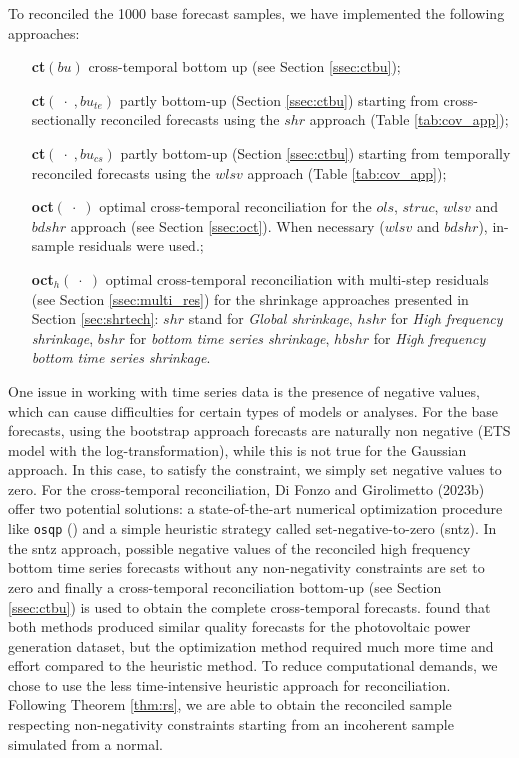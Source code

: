 \documentclass[a4paper,11pt]{article}
\theoremstyle{definition}
\begin{document}
To reconciled the 1000 base forecast samples, we have implemented the following approaches:
\begin{itemize}[nosep, leftmargin = 2.5cm]
	\item[\textbf{ct}$(bu)$] cross-temporal bottom up (see Section \ref{ssec:ctbu});
	\item[\textbf{ct}$(\;\cdot\;, bu_{te})$] partly bottom-up (Section \ref{ssec:ctbu}) starting from cross-sectionally reconciled forecasts using the $shr$ approach (Table \ref{tab:cov_app});
	\item[\textbf{ct}$(\;\cdot\;, bu_{cs})$] partly bottom-up (Section \ref{ssec:ctbu}) starting from temporally reconciled forecasts using the $wlsv$ approach (Table \ref{tab:cov_app});
	\item[\textbf{oct}$(\;\cdot\;)$] optimal cross-temporal reconciliation for the $ols$, $struc$, $wlsv$ and $bdshr$ approach (see Section \ref{ssec:oct}). When necessary ($wlsv$ and $bdshr$), in-sample residuals were used.;
	\item[\textbf{oct}$_{h}(\;\cdot\;)$] optimal cross-temporal reconciliation with multi-step residuals (see Section \ref{ssec:multi_res}) for the shrinkage approaches presented in Section \ref{sec:shrtech}: $shr$ stand for \textit{Global shrinkage}, $hshr$ for \textit{High frequency shrinkage}, $bshr$ for \textit{bottom time series shrinkage}, $hbshr$ for \textit{High frequency bottom time series shrinkage}.
\end{itemize}
One issue in working with time series data is the presence of negative values, which can cause difficulties for certain types of models or analyses. 
For the base forecasts, using the bootstrap approach forecasts are naturally non negative (ETS model with the log-transformation), while this is not true for the Gaussian approach. In this case, to satisfy the constraint, we simply set negative values to zero. For the cross-temporal reconciliation, Di Fonzo and Girolimetto (2023b) offer two potential solutions: a state-of-the-art numerical optimization procedure like \texttt{osqp} (\citealp{stellato2019, stellato2020}) and a simple heuristic strategy called set-negative-to-zero (sntz). In the sntz approach, possible negative values of the reconciled high frequency bottom time series forecasts without any non-negativity constraints are set to zero and finally a cross-temporal reconciliation bottom-up (see Section \ref{ssec:ctbu}) is used to obtain the complete cross-temporal forecasts. \cite{difonzo2023a} found that both methods produced similar quality forecasts for the photovoltaic power generation dataset, but the optimization method required much more time and effort compared to the heuristic method. To reduce computational demands, we chose to use the less time-intensive heuristic approach for reconciliation. Following Theorem \ref{thm:rs}, we are able to obtain the reconciled sample respecting non-negativity constraints starting from an incoherent sample simulated from a normal.
\end{document}
